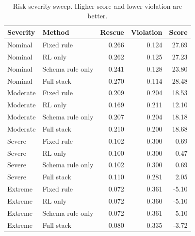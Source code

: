 \begin{table}[t]
  \centering
  \caption{Risk-severity sweep. Higher score and lower violation are better.}
  \label{tab:severity_sweep}
  \begin{tabular}{llrrr}
    \toprule
    Severity & Method & Rescue & Violation & Score \\
    \midrule
    Nominal & Fixed rule & 0.266 & 0.124 & 27.69 \\
    Nominal & RL only & 0.262 & 0.125 & 27.23 \\
    Nominal & Schema rule only & 0.241 & 0.128 & 23.80 \\
    Nominal & Full stack & 0.270 & 0.114 & 28.48 \\
    \midrule
    Moderate & Fixed rule & 0.209 & 0.204 & 18.53 \\
    Moderate & RL only & 0.169 & 0.211 & 12.10 \\
    Moderate & Schema rule only & 0.207 & 0.204 & 18.18 \\
    Moderate & Full stack & 0.210 & 0.200 & 18.68 \\
    \midrule
    Severe & Fixed rule & 0.102 & 0.300 & 0.69 \\
    Severe & RL only & 0.100 & 0.300 & 0.47 \\
    Severe & Schema rule only & 0.102 & 0.300 & 0.69 \\
    Severe & Full stack & 0.110 & 0.281 & 2.05 \\
    \midrule
    Extreme & Fixed rule & 0.072 & 0.361 & -5.10 \\
    Extreme & RL only & 0.072 & 0.360 & -5.10 \\
    Extreme & Schema rule only & 0.072 & 0.361 & -5.10 \\
    Extreme & Full stack & 0.080 & 0.335 & -3.72 \\
    \bottomrule
  \end{tabular}
\end{table}
